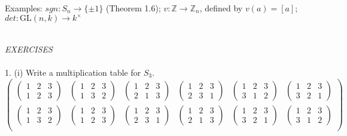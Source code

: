 \documentclass{article}
\begin{document}
Examples: \(sgn: S_{n}\to\{\pm 1\}\) \color{gray} (Theorem 1.6)\color{black}; \(v:\mathbb{Z}\to\mathbb{Z}_{n}\), defined by \(v(a)=[a]\); \(det: \mathrm{GL}(n,k)\to k^{\times}\)\\\\
\begin{siderules}\color{blue}\textit{EXERCISES}\color{black}\\\\
\color{blue}1. (i) Write a multiplication table for \(S_{3}\).\color{black}
\null\qquad \[\begin{pmatrix}\begin{pmatrix}1&2&3\\1&2&3\end{pmatrix}&\begin{pmatrix}1&2&3\\1&3&2\end{pmatrix}&\begin{pmatrix}1&2&3\\2&1&3\end{pmatrix}&\begin{pmatrix}1&2&3\\2&3&1\end{pmatrix}&\begin{pmatrix}1&2&3\\3&1&2\end{pmatrix}&\begin{pmatrix}1&2&3\\3&2&1\end{pmatrix}\\
\begin{pmatrix}1&2&3\\1&3&2\end{pmatrix}&\begin{pmatrix}1&2&3\\1&2&3\end{pmatrix}&\begin{pmatrix}1&2&3\\2&3&1\end{pmatrix}&\begin{pmatrix}1&2&3\\2&1&3\end{pmatrix}&\begin{pmatrix}1&2&3\\3&2&1\end{pmatrix}&\begin{pmatrix}1&2&3\\3&1&2\end{pmatrix}\\

\end{pmatrix}\]
\end{siderules}
\end{document}
